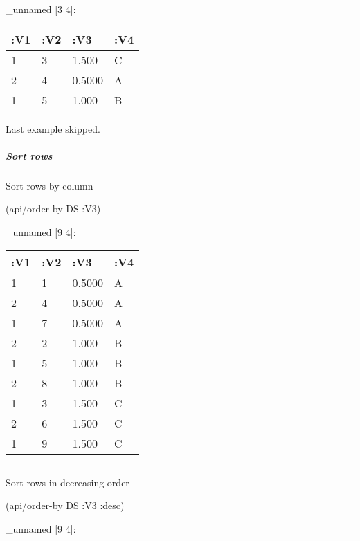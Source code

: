 \documentclass[]{article}
\newenvironment{Shaded}{\begin{snugshade}}{\end{snugshade}}
\newcommand{\KeywordTok}[1]{\textcolor[rgb]{0.13,0.29,0.53}{\textbf{#1}}}
\newcommand{\DecValTok}[1]{\textcolor[rgb]{0.00,0.00,0.81}{#1}}
\newcommand{\VariableTok}[1]{\textcolor[rgb]{0.00,0.00,0.00}{#1}}
\newcommand{\AttributeTok}[1]{\textcolor[rgb]{0.77,0.63,0.00}{#1}}
\newcommand{\NormalTok}[1]{#1}
\let\oldsubparagraph\subparagraph
\renewcommand{\subparagraph}[1]{\oldsubparagraph{#1}\mbox{}}
\begin{document}
\begin{Shaded}
\end{Shaded}

\_unnamed {[}3 4{]}:

\begin{longtable}[]{@{}llll@{}}
\toprule
:V1 & :V2 & :V3 & :V4\tabularnewline
\midrule
\endhead
1 & 3 & 1.500 & C\tabularnewline
2 & 4 & 0.5000 & A\tabularnewline
1 & 5 & 1.000 & B\tabularnewline
\bottomrule
\end{longtable}

Last example skipped.

\subparagraph{Sort rows}\label{sort-rows}

Sort rows by column

\begin{Shaded}
\begin{Highlighting}[]
\NormalTok{(api/order-by DS }\AttributeTok{:V3}\NormalTok{)}
\end{Highlighting}
\end{Shaded}

\_unnamed {[}9 4{]}:

\begin{longtable}[]{@{}llll@{}}
\toprule
:V1 & :V2 & :V3 & :V4\tabularnewline
\midrule
\endhead
1 & 1 & 0.5000 & A\tabularnewline
2 & 4 & 0.5000 & A\tabularnewline
1 & 7 & 0.5000 & A\tabularnewline
2 & 2 & 1.000 & B\tabularnewline
1 & 5 & 1.000 & B\tabularnewline
2 & 8 & 1.000 & B\tabularnewline
1 & 3 & 1.500 & C\tabularnewline
2 & 6 & 1.500 & C\tabularnewline
1 & 9 & 1.500 & C\tabularnewline
\bottomrule
\end{longtable}

\begin{center}\rule{0.5\linewidth}{0.5pt}\end{center}

Sort rows in decreasing order

\begin{Shaded}
\begin{Highlighting}[]
\NormalTok{(api/order-by DS }\AttributeTok{:V3} \AttributeTok{:desc}\NormalTok{)}
\end{Highlighting}
\end{Shaded}

\_unnamed {[}9 4{]}:
\end{document}
